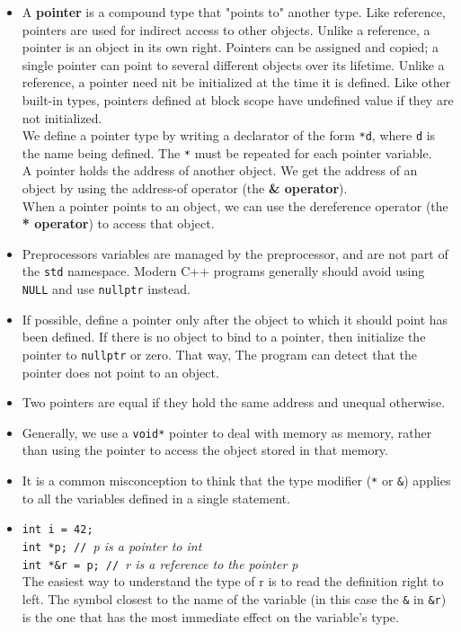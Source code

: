 \begin{itemize}
\item A \textbf{pointer} is a compound type that "points to" another type. Like reference, pointers are used for indirect access to other objects. Unlike a reference, a pointer is an object in its own right. Pointers can be assigned and copied; a single pointer can point to several different objects over its lifetime. Unlike a reference, a pointer need nit be initialized at the time it is defined. Like other built-in types, pointers defined at block scope have undefined value if they are not initialized.\\We define a pointer type by writing a declarator of the form \texttt{*d}, where \texttt{d} is the name being defined. The \texttt{*} must be repeated for each pointer variable.\\A pointer holds the address of another object. We get the address of an object by using the address-of operator (the \textbf{\& operator}).\\When a pointer points to an object, we can use the dereference operator (the \textbf{* operator}) to access that object.

\item Preprocessors variables are managed by the preprocessor, and are not part of the \texttt{std} namespace. Modern C++ programs generally should avoid using \texttt{NULL} and use \texttt{nullptr} instead.

\item If possible, define a pointer only after the object to which it should point has been defined. If there is no object to bind to a pointer, then initialize the pointer to \texttt{nullptr} or zero. That way, The program can detect that the pointer does not point to an object.

\item Two pointers are equal if they hold the same address and unequal otherwise.

\item Generally, we use a \texttt{void*} pointer to deal with memory as memory, rather than using the pointer to access the object stored in that memory.

\item It is a common misconception to think that the type modifier (\texttt{*} or \texttt{\&}) applies to all the variables defined in a single statement.

\item \hspace*{1em}\texttt{int i = 42;}\\\hspace*{1em}\texttt{int *p; // }\textit{p is a pointer to int}\\\hspace*{1em}\texttt{int *\&r = p; // }\textit{r is a reference to the pointer p}\\The easiest way to understand the type of r is to read the definition right to left. The symbol closest to the name of the variable (in this case the \texttt{\&} in \texttt{\&r}) is the one that has the most immediate effect on the variable's type.


\end{itemize}
